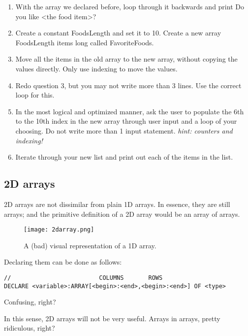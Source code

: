 \documentclass[./main.tex]{subfiles}
\begin{document}
\begin{enumerate}
    \item With the array we declared before, loop through it backwards and print {\ccmono Do you like <the food item>?}
        \mediumlines
    \item Create a constant {\ccmono FoodsLength} and set it to 10. Create a new array {\ccmono FoodsLength} items long called {\ccmono FavoriteFoods}.
        \mediumlines
    \item Move all the items in the old array to the new array, without copying the values directly. Only use indexing to move the values.
        \mediumlines
    \item Redo question 3, but you may not write more than 3 lines. Use the correct loop for this.
        \mediumlines
    \item In the most logical and optimized manner, ask the user to populate the 6th to the 10th index in the new array through user input and a loop of your choosing. Do not write more than 1 input statement. \emph{hint: counters and indexing!}
        \largelines
    \item Iterate through your new list and print out each of the items in the list. 
        \largelines
\end{enumerate}

\newpage
\subsection{2D arrays}

2D arrays are not dissimilar from plain 1D arrays. In essence, they are still arrays; and the primitive definition of a 2D array would be an array of arrays.

\begin{figure}[h]
    \centering
    \texttt{[image: 2darray.png]}
    \caption{A (bad) visual representation of a 1D array.}
    \label{fig:2darray}
\end{figure}

Declaring them can be done as follows:

\begin{verbatim}
//                         COLUMNS       ROWS
DECLARE <variable>:ARRAY[<begin>:<end>,<begin>:<end>] OF <type>
\end{verbatim}

Confusing, right?

In this sense, 2D arrays will not be very useful. Arrays in arrays, pretty ridiculous, right?
\end{document}
